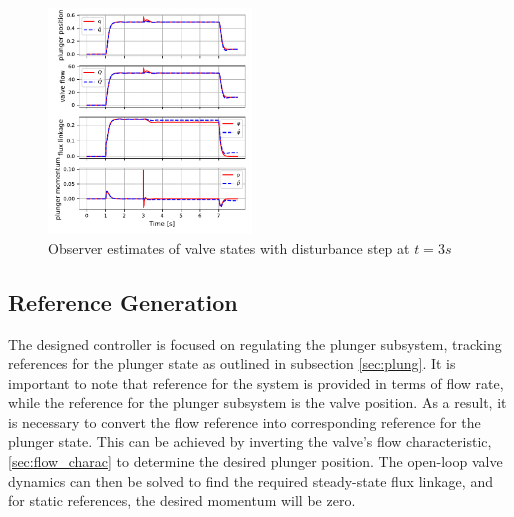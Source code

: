\documentclass[letterpaper, 10pt, conference]{ieeeconf}
\begin{document}

\begin{figure}[!ht]
    \includegraphics[width=0.48\textwidth]{combined_plots_obs_F.pdf}
    \caption{Observer estimates of valve states with disturbance step at $t=3s$}
    \label{fig:flowhat_F}
\end{figure}

\subsection{Reference Generation}
The designed controller is focused on regulating the plunger subsystem, tracking references for the plunger state as outlined in subsection \ref{sec:plung}. It is important to note that reference for the system is provided in terms of flow rate, while the reference for the plunger subsystem is the valve position. As a result, it is necessary to convert the flow reference into corresponding reference for the plunger state. This can be achieved by inverting the valve’s flow characteristic, \ref{sec:flow_charac} to determine the desired plunger position. The open-loop valve dynamics can then be solved to find the required steady-state flux linkage, and for static references, the desired momentum will be zero.
\end{document}
